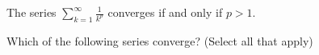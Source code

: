 \documentclass{ximera}
\begin{document}
\begin{theorem}
 The series $\sum_{k=1}^\infty \frac{1}{k^p}$ converges if and only if $p > 1$.
 \end{theorem}
 
\begin{question}
Which of the following series converge? (Select all that apply)

\begin{selectAll}
\end{selectAll}
\end{question}
\end{document}

